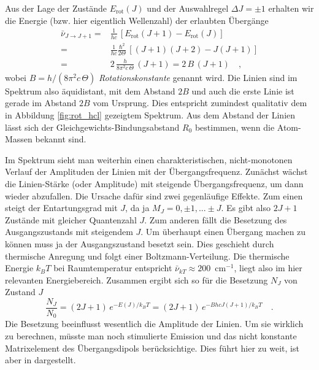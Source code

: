 Aus der Lage der Zustände $E_\text{rot}(J)$ und der Auswahlregel $\Delta J = \pm 1$ erhalten wir die  Energie (bzw. hier eigentlich Wellenzahl) der erlaubten Übergänge
\begin{align}
 \bar{\nu}_{J \rightarrow J + 1} =& \frac{1}{h c}  \, \left[ E_\text{rot}(J+1) - E_\text{rot}(J) \right]
 \\ 
 =  & \frac{1}{h c}\frac{\hbar^2}{2 \Theta} \, \left[ (J+1)(J+2) - J (J+1) \right] \\
 = & 2 \, \frac{h}{8 \pi^2 c \, \Theta} \, \left( J +1 \right) = 2 \, B \, (J+1) \quad ,
\end{align}
wobei $B = h / (8 \pi^2 c \, \Theta)$ \emph{Rotationskonstante} genannt wird. Die Linien sind im Spektrum also äquidistant, mit dem Abstand $2B$ und auch die erste Linie ist gerade im Abstand $2B$ vom Ursprung. Dies entspricht zumindest qualitativ dem in Abbildung \ref{fig:rot_hcl} gezeigtem Spektrum. Aus dem Abstand der Linien lässt sich der Gleichgewichts-Bindungsabstand $R_0$ bestimmen, wenn die Atom-Massen bekannt sind.



\begin{marginfigure}
\caption{Verlauf von $2J +1$ und Boltzmann-Faktor mit $J$.}
\end{marginfigure}


Im Spektrum sieht man weiterhin einen charakteristischen, nicht-monotonen Verlauf der Amplituden der Linien mit der Übergangsfrequenz. Zunächst wächst die Linien-Stärke (oder Amplitude) mit steigende Übergangsfrequenz, um dann wieder abzufallen. Die Ursache dafür sind zwei gegenläufige Effekte. Zum einen steigt der Entartungsgrad mit $J$, da ja $M_J = 0, \pm 1, ... \pm J$. Es gibt also $2J+1$ Zustände mit gleicher Quantenzahl $J$.
Zum anderen fällt die Besetzung des Ausgangszustands mit steigendem $J$. Um überhaupt einen Übergang machen zu können muss ja der Ausgangszustand besetzt sein. Dies geschieht durch thermische Anregung und folgt einer Boltzmann-Verteilung. Die thermische Energie $k_B T$ bei Raumtemperatur entspricht  $\bar{\nu}_{k T} \approx 200$~cm$^{-1}$, liegt also im hier relevanten Energiebereich. Zusammen ergibt sich so für die Besetzung $N_J$ von Zustand $J$
\begin{equation}
 \frac{N_J}{N_0}= (2J+1) \, e^{- E(J) / k_B T} = (2J+1) \, e^{- B hc J (J+1) / k_B T}  \quad .
\end{equation}
Die Besetzung beeinflusst wesentlich die Amplitude der Linien. Um sie wirklich zu berechnen, müsste man noch stimulierte Emission und das nicht konstante Matrixelement des Übergangsdipols berücksichtige. Dies führt hier zu weit, ist aber in \cite{Demtröder_molekuelphysik} dargestellt.






